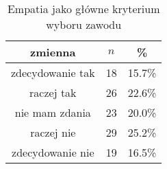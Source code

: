 \begin{table}[H]
\caption{Empatia jako główne kryterium wyboru zawodu}
\centering
\begin{tabular}{ | c | c | c |}
\hline
zmienna & $n$ & \% \\
\hline
zdecydowanie tak  &  18  & 15.7\% \\
\hline
raczej tak  &  26  & 22.6\% \\
\hline
nie mam zdania  &  23  & 20.0\% \\
\hline
raczej nie  &  29  & 25.2\% \\
\hline
zdecydowanie nie  &  19  & 16.5\% \\
\hline
\end{tabular}
\label{tab:Q34}
\end{table}
